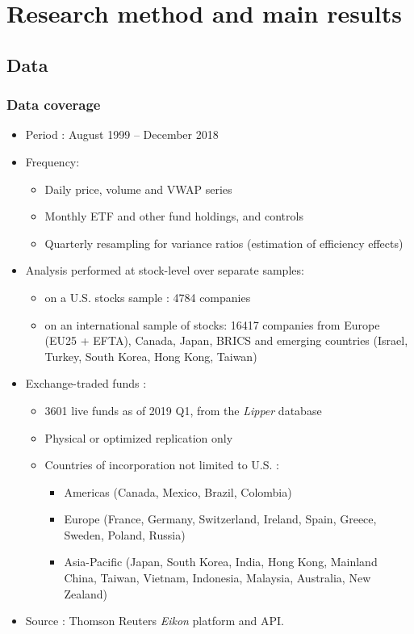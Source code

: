 \documentclass[9pt, usenames, dvipsnames]{beamer}
\begin{document}
\section{Research method and main results}
\subsection{Data}
\begin{frame}
  \frametitle{Data coverage}
  \begin{itemize}
  \item<1-> Period : August 1999 -- December 2018
  \item<2-> Frequency:
    \begin{itemize}
    \item Daily price, volume and VWAP series
    \item Monthly ETF and other fund holdings, and controls
    \item Quarterly resampling for variance ratios (estimation of efficiency effects)
    \end{itemize}
  \item<3-> Analysis performed at stock-level over separate samples:
    \begin{itemize}
    \item on a U.S. stocks sample : 4784 companies
    \item on an international sample of stocks: 16417 companies from Europe (EU25 + EFTA), Canada, Japan, BRICS and emerging countries (Israel, Turkey, South Korea, Hong Kong, Taiwan) 
    \end{itemize}
  \item<4-> Exchange-traded funds :
    \begin{itemize}
    \item 3601 live funds as of 2019 Q1, from the \textit{Lipper} database
    \item Physical or optimized replication only
    \item Countries of incorporation not limited to U.S. :
      \begin{itemize}
      \item Americas (Canada, Mexico, Brazil, Colombia)
      \item Europe (France, Germany, Switzerland, Ireland, Spain, Greece, Sweden, Poland, Russia)
      \item Asia-Pacific (Japan, South Korea, India, Hong Kong, Mainland China, Taiwan, Vietnam, Indonesia, Malaysia, Australia, New Zealand)
      \end{itemize}
    \end{itemize}
    \item<5-> Source : Thomson Reuters \emph{Eikon} platform and API. 
  \end{itemize}
  
\end{frame}
\end{document}
